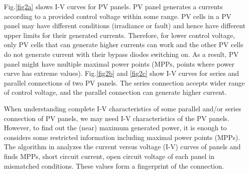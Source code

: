 \documentclass[conference]{IEEEtran}
\begin{document}
Fig.\ref{fig2a} shows  I-V curves for PV panels. PV panel generates a currents according to a provided control voltage within some range.
PV cells in a PV panel may have different conditions (irradiance or fault) and hence have different upper limits for their generated currents. Therefore, for lower control voltage, only PV cells that can generate higher currents can work and the other PV cells do not generate current with their bypass diodes switching on. As a result, PV panel might have multiple maximal power points (MPPs, points where power curve has extreme values). 
Fig.\ref{fig2b} and \ref{fig2c} show I-V curves for series and parallel connections of two PV panels. The series connection accepts wider range of control voltage, and the parallel connection can generate higher current. 

When understanding complete I-V characteristics of some parallel and/or series connection of PV panels, we may need I-V characteristics of the PV panels. However, to find out the (near) maximum generated power, it is enough to considers some restricted information including maximal power points (MPPs). The algorithm in \cite{b6} analyzes the current versus voltage (I-V) curves of panels and finds MPPs, short circuit current, open circuit voltage of each panel in mismatched conditions. These values form a fingerprint of the connection.


\end{document}

